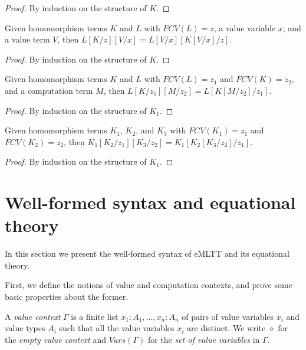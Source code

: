 \begin{proof}
By induction on the structure of $K$.
\end{proof}

\begin{proposition}
\label{prop:hompsubstvaluesubst}
Given homomorphism terms $K$ and $L$ with $FCV(L) = z$, a value variable $x$, and a value term $V$, then $L[K/z][V/x] = L[V/x][K[V/x]/z]$.
\end{proposition}

\begin{proof}
By induction on the structure of $K$.
\end{proof}

\begin{proposition}
\label{prop:hompsubstcompsubst}
Given homomorphism terms $K$ and $L$ with $FCV(L) = z_1$ and \linebreak $FCV(K) = z_2$, and a computation term $M$, then $L[K/z_1][M/z_2] = L[K[M/z_2]/z_1]$.
\end{proposition}

\begin{proof}
By induction on the structure of $K_1$.
\end{proof}

\begin{proposition}
\label{prop:hompsubsthomsubst}
Given homomorphism terms $K_1$, $K_2$, and $K_3$ with $FCV(K_1) = z_1$ and $FCV(K_2) = z_2$, then $K_1[K_2/z_1][K_3/z_2] = K_1[K_2[K_3/z_2]/z_1]$.
\end{proposition}

\begin{proof}
By induction on the structure of $K_1$.
\end{proof}

\section{Well-formed syntax and equational theory}
\label{sect:judgements}

In this section we present the well-formed syntax of eMLTT and its equational theory.


First, we define the notions of value and computation contexts, and prove some basic properties about the former.

\begin{definition}
\label{def:contexts}
A \emph{value context} $\Gamma$ is a finite list $x_1 \!:\! A_1, \ldots, x_n \!:\! A_n$ of pairs of value variables $x_i$ and value types $A_i$ such that all the value variables $x_i$ are distinct. We write $\diamond$ for the \emph{empty value context} and $V\!ars(\Gamma)$ for the \emph{set of value variables} in $\Gamma$.
\end{definition}

